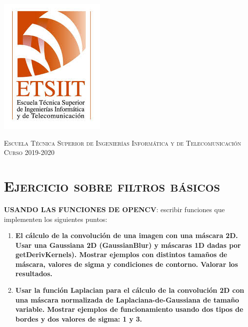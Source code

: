 \documentclass[11pt,a4paper]{article}
\begin{document}
\begin{titlepage}
\begin{minipage}{\textwidth}
\includegraphics[scale=0.3]{img/etsiit.jpeg}

\vspace{0.7cm}
\textsc{Escuela Técnica Superior de Ingenierías Informática y de Telecomunicación}\\
\vspace{1cm}
\textsc{Curso 2019-2020}
\end{minipage}
\end{titlepage}

\tableofcontents
\thispagestyle{empty}				%

\newpage

\setlength{\parskip}{1em}

\section{\textsc{Ejercicio sobre filtros básicos}}

\noindent \textbf{USANDO LAS FUNCIONES DE OPENCV}: escribir funciones que implementen los siguientes puntos:

\begin{enumerate}[label=\textbf{\Alph*)}]
	\item \textbf{El cálculo de la convolución de una imagen con una máscara 2D. Usar una Gaussiana 2D (GaussianBlur)
	y máscaras 1D dadas por getDerivKernels). Mostrar ejemplos con distintos tamaños de máscara, valores de
	sigma y condiciones de contorno. Valorar los resultados.}
	\item \textbf{Usar la función Laplacian para el cálculo de la convolución 2D con una máscara normalizada de
	Laplaciana-de-Gaussiana de tamaño variable. Mostrar ejemplos de funcionamiento usando dos tipos de
	bordes y dos valores de sigma: 1 y 3.}
\end{enumerate}
\end{document}
